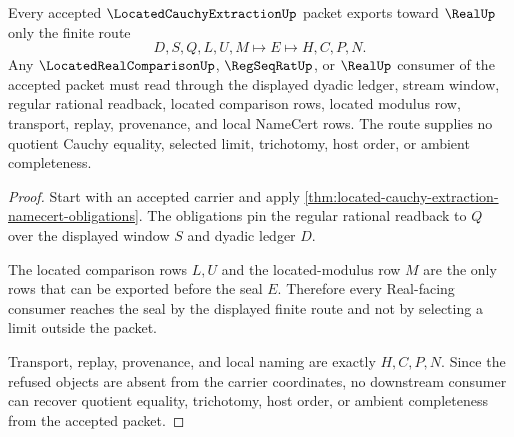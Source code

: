 \begin{theorem}
\label{thm:located-cauchy-extraction-real-seal-route}
Every accepted $\LocatedCauchyExtractionUp$ packet exports toward $\RealUp$
only the finite route
$$
D,S,Q,L,U,M \longmapsto E \longmapsto H,C,P,N .
$$
Any $\LocatedRealComparisonUp$, $\RegSeqRatUp$, or $\RealUp$ consumer of the
accepted packet must read through the displayed dyadic ledger, stream window,
regular rational readback, located comparison rows, located modulus row,
transport, replay, provenance, and local NameCert rows. The route supplies no
quotient Cauchy equality, selected limit, trichotomy, host order, or ambient
completeness.
\end{theorem}
\begin{proof}
Start with an accepted carrier and apply
\autoref{thm:located-cauchy-extraction-namecert-obligations}. The obligations
pin the regular rational readback to $Q$ over the displayed window $S$ and
dyadic ledger $D$.

The located comparison rows $L,U$ and the located-modulus row $M$ are the only
rows that can be exported before the seal $E$. Therefore every Real-facing
consumer reaches the seal by the displayed finite route and not by selecting a
limit outside the packet.

Transport, replay, provenance, and local naming are exactly $H,C,P,N$. Since
the refused objects are absent from the carrier coordinates, no downstream
consumer can recover quotient equality, trichotomy, host order, or ambient
completeness from the accepted packet.
\end{proof}


\begin{closurestatus}{\LocatedCauchyExtractionUp}
  \theoryclosure{\seedClosure}
  \formalstatus{\theoremCheckedV}
\end{closurestatus}
